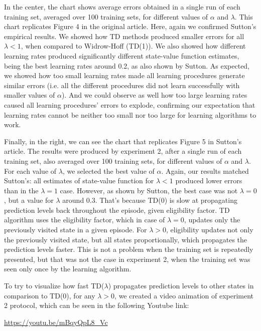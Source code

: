 \documentclass{article}
\begin{document}
In the center, the chart shows average errors obtained in a single run of each training set, averaged over 100 training sets, for different values of $\alpha$ and $\lambda$.
This chart replicates Figure 4 in the original article.
Here, again we confirmed Sutton's empirical results.
We showed how TD methods produced smaller errors for all $\lambda < 1$, when compared to Widrow-Hoff (TD(1)).
We also showed how different learning rates produced significantly different state-value function estimates, being the best learning rates around 0.2, as also shown by Sutton.
As expected, we showed how too small learning rates made all learning procedures generate similar errors (i.e. all the different procedures did not learn successfully with smaller values of $\alpha$).
And we could observe as well how too large learning rates caused all learning procedures' errors to explode, confirming our expectation that learning rates cannot be neither too small nor too large for learning algorithms to work.

Finally, in the right, we can see the chart that replicates Figure 5 in Sutton's article.
The results were produced by experiment 2, after a single run of each training set, also averaged over 100 training sets, for different values of $\alpha$ and $\lambda$.
For each value of $\lambda$, we selected the best value of $\alpha$.
Again, our results matched Sutton's: all estimates of state-value function for $\lambda < 1$ produced lower errors than in the $\lambda = 1$ case.
However, as shown by Sutton, the best case was not $\lambda = 0$, but a value for $\lambda$ around 0.3.
That's because TD(0) is slow at propagating prediction levels back throughout the episode, given eligibility factor.
TD algorithm uses the eligibility factor, which in case of $\lambda = 0$, updates only the previously visited state in a given episode.
For $\lambda > 0$, eligibility updates not only the previously visited state, but all states proportionally, which propagates the prediction levels faster.
This is not a problem when the training set is repeatedly presented, but that was not the case in experiment 2, when the training set was seen only once by the learning algorithm.

To try to visualize how fast TD($\lambda$) propagates prediction levels to other states in comparison to TD(0), for any $\lambda > 0$, we created a video animation of experiment 2 protocol, which can be seen in the following Youtube link:
\begin{center}
    \url{https://youtu.be/mBqyQpL8_Vc}
\end{center}
\end{document}
